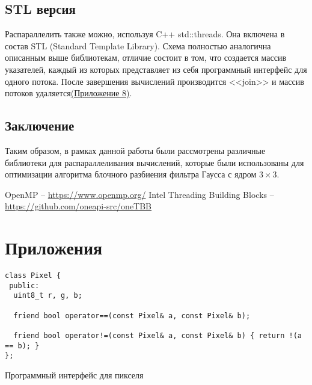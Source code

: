 \documentclass[12pt]{article}
\newenvironment{longlisting}{\captionsetup{type=listing, name=Приложение}}{}
\begin{document}
\subsection{STL версия}
Распараллелить также можно, используя C++ std::threads. Она включена в состав STL (Standard Template Library). Схема полностью аналогична описанным выше библиотекам, отличие состоит в том, что создается массив указателей, каждый из которых представляет из себя программный интерфейс для одного потока. После завершения вычислений производится <<join>> и массив потоков удаляется\hyperref[lst:stl]{(Приложение 8)}.
\newpage
\begin{center}
\section*{Заключение}
\end{center}
Таким образом, в рамках данной работы были рассмотрены различные библиотеки для распараллеливания вычислений, которые были использованы для оптимизации алгоритма блочного разбиения фильтра Гаусса с ядром $3 \times 3$.

\newpage
{}

\begin{thebibliography}{9}
	 OpenMP -- \url{https://www.openmp.org/}
	 Intel Threading Building Blocks -- \url{https://github.com/oneapi-src/oneTBB}
\end{thebibliography}


\newpage
\section*{Приложения}

\begin{longlisting}
\begin{verbatim}
class Pixel {
 public:
  uint8_t r, g, b;

  friend bool operator==(const Pixel& a, const Pixel& b);

  friend bool operator!=(const Pixel& a, const Pixel& b) { return !(a == b); }
};
\end{verbatim}
\caption{Программный интерфейс для пикселя}
\label{lst:pixel}
\end{longlisting}
\end{document}
